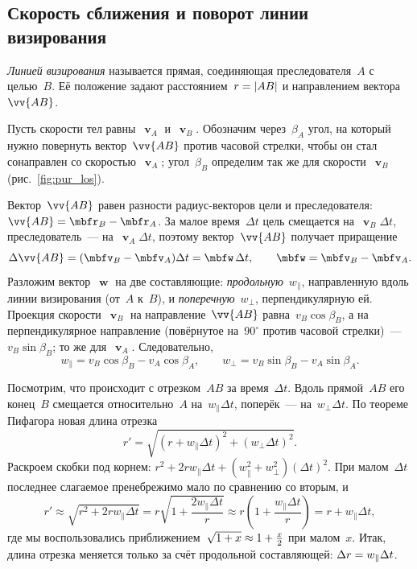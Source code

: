\documentclass[../main.tex]{subfiles}
\begin{document}
\subsection{Скорость сближения и поворот линии визирования}

\begin{definition}
\textit{Линией визирования} называется прямая, соединяющая преследователя~$A$ с
целью~$B$. Её положение задают расстоянием~$r \hm= |AB|$ и направлением вектора~$\vv{AB}$.
\end{definition}

Пусть скорости тел равны~$\mbfv_A$ и~$\mbfv_B$. Обозначим через~$\beta_A$ угол, на
который нужно повернуть вектор~$\vv{AB}$ против часовой стрелки, чтобы он стал
сонаправлен со скоростью~$\mbfv_A$; угол~$\beta_B$ определим так же для скорости~$\mbfv_B$ (рис.~\ref{fig:pur_los}).


Вектор~$\vv{AB}$ равен разности радиус-векторов цели и преследователя:
$\vv{AB} \hm= \mbfr_B - \mbfr_A$. За малое время~$\Delta t$ цель смещается на~$\mbfv_B\Delta t$, преследователь~--- на~$\mbfv_A\Delta t$, поэтому вектор~$\vv{AB}$
получает приращение
\[
\Delta\vv{AB} = (\mbfv_B - \mbfv_A)\Delta t = \mbfw\,\Delta t,
\qquad
\mbfw = \mbfv_B - \mbfv_A.
\]
Разложим вектор~$\mbfw$ на две составляющие: \textit{продольную}~$w_\parallel$,
направленную вдоль линии визирования (от~$A$ к~$B$), и \textit{поперечную}~$w_\perp$,
перпендикулярную ей. Проекция скорости~$\mbfv_B$ на направление~$\vv{AB}$ равна~$v_B\cos\beta_B$, а на перпендикулярное направление (повёрнутое на~$90^\circ$ против
часовой стрелки)~--- $v_B\sin\beta_B$; то же для~$\mbfv_A$. Следовательно,
\[
w_\parallel = v_B\cos\beta_B - v_A\cos\beta_A,
\qquad
w_\perp = v_B\sin\beta_B - v_A\sin\beta_A.
\]

Посмотрим, что происходит с отрезком~$AB$ за время~$\Delta t$. Вдоль прямой~$AB$ его
конец~$B$ смещается относительно~$A$ на~$w_\parallel\Delta t$, поперёк~--- на~$w_\perp\Delta t$. По теореме Пифагора новая длина отрезка
\[
r' = \sqrt{(r + w_\parallel\Delta t)^2 + (w_\perp\Delta t)^2}.
\]
Раскроем скобки под корнем: $r^2 + 2rw_\parallel\Delta t + (w_\parallel^2 +
w_\perp^2)(\Delta t)^2$. При малом~$\Delta t$ последнее слагаемое пренебрежимо мало
по сравнению со вторым, и
\[
r' \approx \sqrt{r^2 + 2rw_\parallel\Delta t}
= r\sqrt{1 + \frac{2w_\parallel\Delta t}{r}}
\approx r\left(1 + \frac{w_\parallel\Delta t}{r}\right)
= r + w_\parallel\Delta t,
\]
где мы воспользовались приближением~$\sqrt{1 + x} \hm\approx 1 + \frac{x}{2}$ при
малом~$x$. Итак, длина отрезка меняется только за счёт продольной составляющей:
$\Delta r \hm= w_\parallel\Delta t$.
\end{document}
